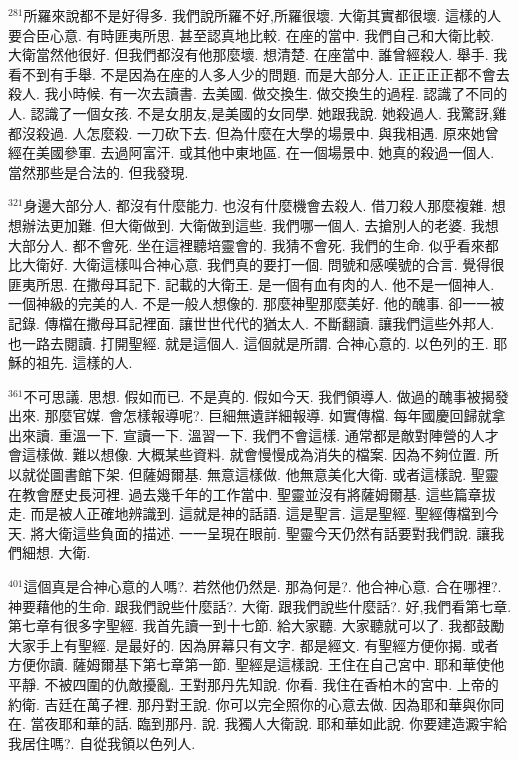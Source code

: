 \documentclass{book}
\begin{document}
$^{281}$所羅來說都不是好得多.
我們說所羅不好,所羅很壞.
大衛其實都很壞.
這樣的人要合臣心意.
有時匪夷所思.
甚至認真地比較.
在座的當中.
我們自己和大衛比較.
大衛當然他很好.
但我們都沒有他那麼壞.
想清楚.
在座當中.
誰曾經殺人.
舉手.
我看不到有手舉.
不是因為在座的人多人少的問題.
而是大部分人.
正正正正都不會去殺人.
我小時候.
有一次去讀書.
去美國.
做交換生.
做交換生的過程.
認識了不同的人.
認識了一個女孩.
不是女朋友,是美國的女同學.
她跟我說.
她殺過人.
我驚訝,雞都沒殺過.
人怎麼殺.
一刀砍下去.
但為什麼在大學的場景中.
與我相遇.
原來她曾經在美國參軍.
去過阿富汗.
或其他中東地區.
在一個場景中.
她真的殺過一個人.
當然那些是合法的.
但我發現.

$^{321}$身邊大部分人.
都沒有什麼能力.
也沒有什麼機會去殺人.
借刀殺人那麼複雜.
想想辦法更加難.
但大衛做到.
大衛做到這些.
我們哪一個人.
去搶別人的老婆.
我想大部分人.
都不會死.
坐在這裡聽培靈會的.
我猜不會死.
我們的生命.
似乎看來都比大衛好.
大衛這樣叫合神心意.
我們真的要打一個.
問號和感嘆號的合言.
覺得很匪夷所思.
在撒母耳記下.
記載的大衛王.
是一個有血有肉的人.
他不是一個神人.
一個神級的完美的人.
不是一般人想像的.
那麼神聖那麼美好.
他的醜事.
卻一一被記錄.
傳檔在撒母耳記裡面.
讓世世代代的猶太人.
不斷翻讀.
讓我們這些外邦人.
也一路去閱讀.
打開聖經.
就是這個人.
這個就是所謂.
合神心意的.
以色列的王.
耶穌的祖先.
這樣的人.

$^{361}$不可思議.
思想.
假如而已.
不是真的.
假如今天.
我們領導人.
做過的醜事被揭發出來.
那麼官媒.
會怎樣報導呢?.
巨細無遺詳細報導.
如實傳檔.
每年國慶回歸就拿出來讀.
重溫一下.
宣讀一下.
溫習一下.
我們不會這樣.
通常都是敵對陣營的人才會這樣做.
難以想像.
大概某些資料.
就會慢慢成為消失的檔案.
因為不夠位置.
所以就從圖書館下架.
但薩姆爾基.
無意這樣做.
他無意美化大衛.
或者這樣說.
聖靈在教會歷史長河裡.
過去幾千年的工作當中.
聖靈並沒有將薩姆爾基.
這些篇章拔走.
而是被人正確地辨識到.
這就是神的話語.
這是聖言.
這是聖經.
聖經傳檔到今天.
將大衛這些負面的描述.
一一呈現在眼前.
聖靈今天仍然有話要對我們說.
讓我們細想.
大衛.

$^{401}$這個真是合神心意的人嗎?.
若然他仍然是.
那為何是?.
他合神心意.
合在哪裡?.
神要藉他的生命.
跟我們說些什麼話?.
大衛.
跟我們說些什麼話?.
好,我們看第七章.
第七章有很多字聖經.
我首先讀一到十七節.
給大家聽.
大家聽就可以了.
我都鼓勵大家手上有聖經.
是最好的.
因為屏幕只有文字.
都是經文.
有聖經方便你揭.
或者方便你讀.
薩姆爾基下第七章第一節.
聖經是這樣說.
王住在自己宮中.
耶和華使他平靜.
不被四圍的仇敵擾亂.
王對那丹先知說.
你看.
我住在香柏木的宮中.
上帝的約衛.
吉廷在萬子裡.
那丹對王說.
你可以完全照你的心意去做.
因為耶和華與你同在.
當夜耶和華的話.
臨到那丹.
說.
我獨人大衛說.
耶和華如此說.
你要建造澱宇給我居住嗎?.
自從我領以色列人.
\end{document}
